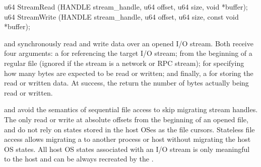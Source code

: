 


\begin{paldef}
u64 StreamRead  (HANDLE stream_handle, u64 offset, u64 size,
                 void *buffer);
u64 StreamWrite (HANDLE stream_handle, u64 offset, u64 size,
                 const void *buffer);
\end{paldef}                   
              
 and  synchronously
read and write data over an opened I/O stream.
Both \hostapis{} receive four arguments: a  for referencing the target I/O stream;
 from the beginning of a regular file
(ignored if the stream is a network or RPC stream);
 for specifying how many bytes are expected to be read or written;
and finally, a  for storing the read or written data.
At success, the \hostapis{} return the number of bytes
actually being read or written.


     







 and  avoid the semantics of sequential file access
to skip migrating stream handles.
The \hostapis{} only read or write at absolute offsets
from the beginning of an opened file,
and do not rely on states stored in the host OSes as the file cursors.
Stateless file access 
allows migrating a \libos{} to another process or host 
without migrating the host OS states.
All host OS states associated with an I/O stream is only meaningful to the host
and can be always recreated by the \libos{}.






